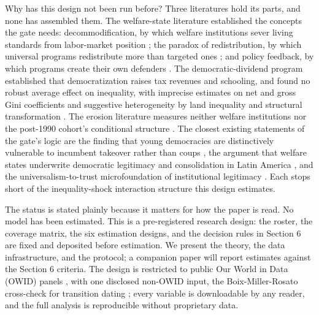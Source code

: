Why has this design not been run before? Three literatures hold its parts, and none has assembled them. The welfare-state literature established the concepts the gate needs: decommodification, by which welfare institutions sever living standards from labor-market position \citep{EspingAndersen1990}; the paradox of redistribution, by which universal programs redistribute more than targeted ones \citep{KorpiPalme1998}; and policy feedback, by which programs create their own defenders \citep{Pierson1993, SossSchram2007}. The democratic-dividend program established that democratization raises tax revenues and schooling, and found no robust average effect on inequality, with imprecise estimates on net and gross Gini coefficients and suggestive heterogeneity by land inequality and structural transformation \citep{AcemogluNaidu2015}. The erosion literature measures neither welfare institutions nor the post-1990 cohort's conditional structure \citep{RauStokes2025, HaggardKaufman2021}. The closest existing statements of the gate's logic are the finding that young democracies are distinctively vulnerable to incumbent takeover rather than coups \citep{Svolik2015}, the argument that welfare states underwrite democratic legitimacy and consolidation in Latin America \citep{HuberStephens2001, HuberStephens2012}, and the universalism-to-trust microfoundation of institutional legitimacy \citep{RothsteinUslaner2005}. Each stops short of the inequality-shock interaction structure this design estimates.

The status is stated plainly because it matters for how the paper is read. No model has been estimated. This is a pre-registered research design: the roster, the coverage matrix, the six estimation designs, and the decision rules in Section 6 are fixed and deposited before estimation. We present the theory, the data infrastructure, and the protocol; a companion paper will report estimates against the Section 6 criteria. The design is restricted to public Our World in Data (OWID) panels \citep{OurWorldInData2025}, with one disclosed non-OWID input, the Boix-Miller-Rosato cross-check for transition dating \citep{BoixMiller2013}; every variable is downloadable by any reader, and the full analysis is reproducible without proprietary data.


